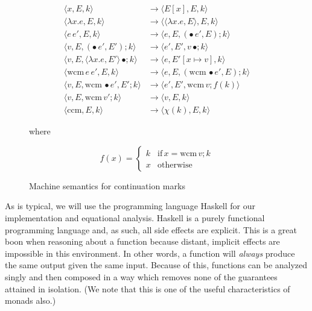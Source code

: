 \documentclass[ms]{byuprop}
\begin{document}
\begin{figure}
\begin{align*}
\langle x,E,k\rangle                                       &\rightarrow\langle E[x],E,k\rangle\\
\langle\lambda x.e,E,k\rangle                              &\rightarrow\langle \langle\lambda x.e,E\rangle,E,k\rangle\\
\langle e\,e',E,k\rangle                                   &\rightarrow\langle e,E,(\bullet\,e',E);k\rangle\\
\langle v,E,(\bullet\,e',E');k\rangle                      &\rightarrow\langle e',E',v\,\bullet;k\rangle\\
\langle v,E,\langle\lambda x.e,E'\rangle\,\bullet;k\rangle &\rightarrow\langle e,E'[x\mapsto v],k\rangle\\
\langle \mathrm{wcm}\,e\,e',E,k\rangle                     &\rightarrow\langle e,E,(\mathrm{wcm}\,\bullet e',E);k\rangle\\
\langle v,E,\mathrm{wcm}\,\bullet e',E';k\rangle           &\rightarrow\langle e',E',\mathrm{wcm}\,v;f(k)\rangle\\
\langle v,E,\mathrm{wcm}\,v';k\rangle                      &\rightarrow\langle v,E,k\rangle\\
\langle \mathrm{ccm},E,k\rangle                            &\rightarrow\langle \chi(k),E,k\rangle
\end{align*}

where 

\[
f(x)=
\left\{
\begin{array}{lr}
k & \mathrm{if}\,x=\mathrm{wcm}\,v;k\\
x & \mathrm{otherwise}
\end{array}
\right.
\]

\caption{Machine semantics for continuation marks}
\label{machine-semantics}
\end{figure}


As is typical, we will use the programming language Haskell \cite{jones2003haskell} for
our implementation and equational analysis. Haskell is a purely functional programming
language and, as such, all side effects are explicit. This is a great boon when reasoning
about a function because distant, implicit effects are impossible in this environment. In
other words, a function will \emph{always} produce the same output given the same input.
Because of this, functions can be analyzed singly and then composed in a way which removes
none of the guarantees attained in isolation. (We note that this is one of the useful
characteristics of monads also.)
\end{document}
